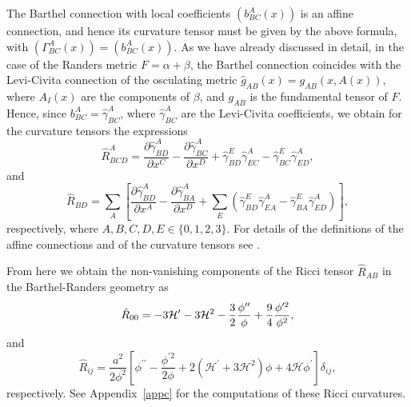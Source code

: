 \documentclass[aps,superscriptaddress, showpacs,preprintnumbers, superscriptaddress, nofootinbibt,twocolumn]{revtex4-2}
\begin{document}
The Barthel connection with local coefficients $\left(b_{BC}^A(x)\right)$ is an affine connection, and hence its curvature tensor must be given by the above formula,  with $\left(\Gamma _{BC}^A(x)\right)=\left(b_{BC}^A(x)\right)$. As we have already discussed in detail, in the case of the Randers metric $F=\alpha +\beta$, the Barthel connection coincides with the Levi-Civita connection of the osculating metric $\hat{g}_{AB}(x)=g_{AB}\left(x,A(x)\right)$, where $A_I(x)$ are the components of $\beta$, and $g_{AB}$ is the fundamental tensor of $F$. Hence, since $b_{BC}^A=\hat{\gamma}_{BC}^A$, where $\hat{\gamma}_{BC}^A$ are the Levi-Civita coefficients, we obtain for the curvature tensors the expressions
\begin{equation}
\hat{R}^A_{BCD}=\dfrac{\partial \hat{\gamma}^A_{BD}}{\partial x^C}-
    \dfrac{\partial \hat{\gamma}^A_{BC}}{\partial x^D}+\hat{\gamma}^E_{BD}\hat{\gamma}^A_{EC}
    -\hat{\gamma}^E_{BC}\hat{\gamma}^A_{ED},
    \end{equation}
    and
    \begin{equation}
\hat{R}_{BD}=
    \displaystyle\sum_A\left[\dfrac{\partial \hat{\gamma}^A_{BD}}{\partial x^A}-\dfrac{\partial \hat{\gamma}^A_{BA}}{\partial x^D}
    +\sum _E\left(\hat{\gamma}^E_{BD}\hat{\gamma}^A_{EA}-\hat{\gamma}^E_{BA}\hat{\gamma}^A_{ED}\right)\right],
 \end{equation}
respectively, where $A,B,C,D,E\in \{0,1,2,3\}$. For details of the definitions of the affine connections and of the curvature tensors see \cite{Chern1}.

From here we obtain the non-vanishing components of the Ricci tensor $\hat{R}_{AB}$ in the Barthel-Randers geometry as
\begin{equation}\label{Ric1}
   \hat{R}_{00}=-3\mathcal{H}^{\prime }-3\mathcal{H}^{2}-\frac{3}{2}\frac{\phi ^{\prime \prime }}{%
\phi }+\frac{9}{4}\frac{\phi ^{\prime 2}}{\phi ^{2}},
\end{equation}
and
\begin{equation}\label{Ric2}
   \hat{R}_{ij}=
   \frac{a^{2}}{2\phi ^{2}}\left[ \phi ^{\prime \prime }-\frac{\phi ^{\prime
2}}{2\phi }+2\left( \mathcal{H}^{\prime }+3\mathcal{H}^{2}\right) \phi +4\mathcal{H}\phi ^{\prime }\right]\delta_{ij},
\end{equation}
respectively. See Appendix~\ref{appc} for the computations of these Ricci curvatures.
\end{document}
